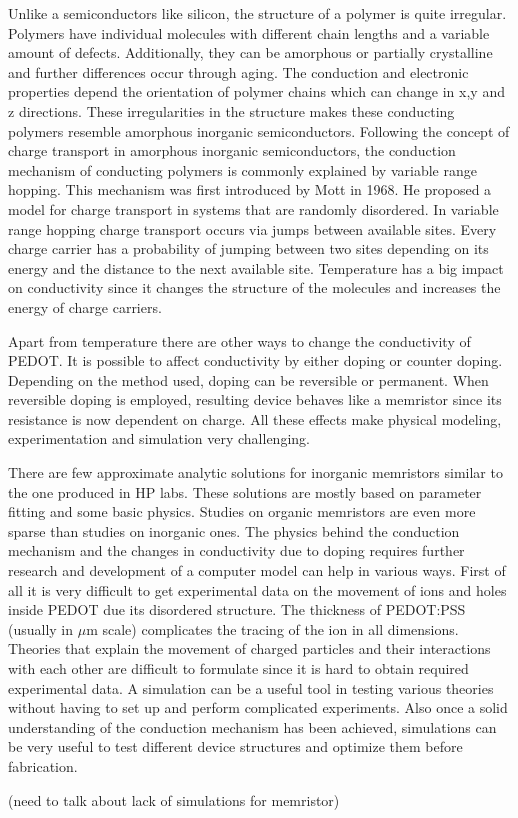 \begin{doublespace}
Unlike a semiconductors like silicon, the structure of a polymer is quite irregular. Polymers have individual molecules with different chain lengths and a variable amount of defects.
Additionally, they can be amorphous or partially crystalline and further differences occur through aging. The conduction and electronic properties depend the orientation of polymer chains which can change in x,y and z directions. These irregularities in the structure makes these conducting polymers resemble amorphous inorganic semiconductors. Following the concept of charge transport in amorphous inorganic semiconductors, the conduction mechanism of conducting polymers is commonly explained by variable range hopping. This mechanism was first introduced by Mott in 1968. He proposed a model for charge transport in systems that are randomly disordered. In variable range hopping charge transport occurs via jumps between available sites. Every charge carrier has a probability of jumping between two sites depending on its energy and the distance to the next available site. Temperature has a big impact on conductivity since it changes the structure of the molecules and increases the energy of charge carriers.

Apart from temperature there are other ways to change the conductivity of PEDOT. It is possible to affect conductivity by either doping or counter doping. Depending on the method used, doping can be reversible or permanent. When reversible doping is employed, resulting device behaves like a memristor since its resistance is now dependent on charge. All these effects make physical modeling, experimentation and simulation very challenging. 

There are few approximate analytic solutions for inorganic memristors similar to the one produced in HP labs. These solutions are mostly based on parameter fitting and some basic physics. Studies on organic memristors are even more sparse than studies on inorganic ones. The physics behind the conduction mechanism and the changes in conductivity due to doping requires further research and development of a computer model can help in various ways. First of all it is very difficult to get experimental data on the movement of ions and holes inside PEDOT due its disordered structure. The thickness of PEDOT:PSS (usually in $\mu$m scale) complicates the tracing of the ion in all dimensions. Theories that explain the movement of charged particles and their interactions with each other are difficult to formulate since it is hard to obtain required experimental data. A simulation can be a useful tool in testing various theories without having to set up and perform complicated experiments. Also once a solid understanding of the conduction mechanism has been achieved, simulations can be very useful to test different device structures and optimize them before fabrication. 

(need to talk about lack of simulations for memristor)
 \end{doublespace}